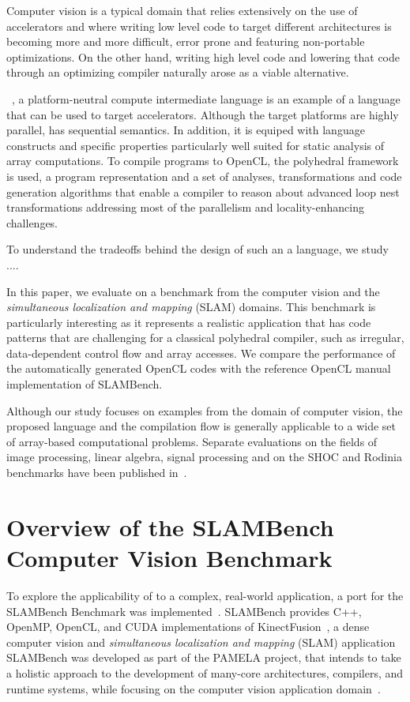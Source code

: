\documentclass{llncs}
\begin{document}
Computer vision is a typical domain that relies extensively on the
use of accelerators and where writing low level code to target
different architectures is becoming more and more difficult, error
prone and featuring non-portable optimizations.
On the other hand, writing high level code and lowering that code
through an optimizing compiler naturally arose as a viable alternative.

\pencil{}~\cite{pencil,pencil_pact,pencil_wolfhpc}, a platform-neutral
compute intermediate language is an example of a language that can be
used to target accelerators.
Although the target platforms are highly parallel, \pencil{} has
sequential semantics.  In addition, it is equiped with language
constructs and specific properties particularly well
suited for static analysis of array computations.
To compile \pencil{} programs to OpenCL, the polyhedral framework is used,
a program representation and a set of analyses, transformations and code
generation algorithms that enable a compiler to reason about advanced
loop nest transformations addressing most of the parallelism and
locality-enhancing challenges.

To understand the tradeoffs behind the design of such an a
language, we study ....

In this paper, we evaluate \pencil{} on a benchmark from the computer
vision and the \textit{simultaneous localization and mapping} (SLAM)
domains.
This benchmark is particularly interesting as it represents a realistic
application that has code patterns that are challenging for a classical
polyhedral compiler, such as irregular, data-dependent control flow
and array accesses.
We compare the performance of the automatically generated OpenCL codes
with the reference OpenCL manual implementation of SLAMBench.

Although our study focuses on examples from the domain of computer
vision, the proposed language and the \pencil{} compilation flow
is generally applicable to a wide set of array-based computational
problems.
Separate evaluations on the fields of image processing, linear algebra,
signal processing and on the SHOC and Rodinia benchmarks have been
published in~\cite{pencil_pact}.

\section{Overview of the SLAMBench Computer Vision Benchmark}

To explore the applicability of \pencil to a complex,
real-world application, a \pencil port for the SLAMBench
Benchmark was implemented~\cite{SLAMBench2015}.
SLAMBench provides C++, OpenMP, OpenCL, and CUDA implementations
of KinectFusion~\cite{KinectFusion2011}, a dense computer vision
and \textit{simultaneous localization and mapping} (SLAM)
application
SLAMBench was developed as part of the PAMELA project, that
intends to take a holistic approach to the development
of many-core architectures, compilers, and runtime systems,
while focusing on the computer vision application
domain~\cite{PAMELAWeb2012}.
\end{document}
